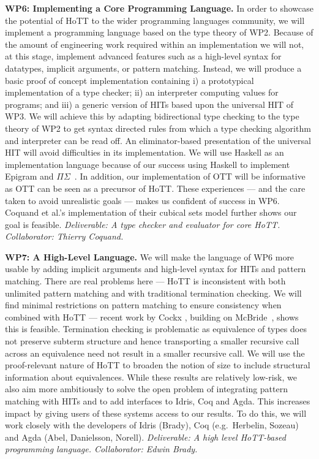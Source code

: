 \documentclass[a4paper,11pt]{article}
\newcommand{\eg}{{e.g.}\ }
\begin{document}
{\bf WP6: Implementing a Core Programming Language.} In order to
showcase the potential of HoTT to the wider programming languages
community, we will implement a programming language based on the type
theory of WP2.  Because of the amount of engineering work required
within an implementation we will not, at this stage, implement
advanced features such as a high-level syntax for datatypes, implicit
arguments, or pattern matching. Instead, we will produce a basic proof
of concept implementation containing i) a prototypical implementation
of a type checker; ii) an interpreter computing values for programs;
and iii) a generic version of HITs based upon the universal HIT of
WP3. We will achieve this by adapting bidirectional type checking to
the type theory of WP2 to get syntax directed rules from which a type
checking algorithm and interpreter can be read off. An
eliminator-based presentation of the universal HIT will
avoid difficulties in its implementation. We will use Haskell as an
implementation language because of our 
success using Haskell to implement Epigram and
$\Pi\Sigma$~\cite{alti:checking,easy,alti:pisigma-new}. In addition,
our implementation of OTT will be informative as OTT can be seen as a
precursor of HoTT.  These experiences --- and the care taken to avoid
unrealistic goals --- makes us confident of success in
WP6. Coquand et al.'s implementation of their cubical sets
model further shows our goal is feasible. {\em Deliverable: A type
  checker and evaluator for core HoTT.  Collaborator: Thierry Coquand.
}


{\bf WP7: A High-Level Language.} We will make the
language of WP6 more usable by adding implicit arguments and
high-level syntax for HITs and pattern matching. There are real
problems here --- HoTT is inconsistent with both unlimited pattern
matching and with traditional termination checking. We will find
minimal restrictions on pattern matching to ensure consistency when
combined with HoTT --- recent work by Cockx \cite{cockx-without-k},
building on McBride~\cite{viewftl}, shows this is
feasible. Termination checking is problematic as equivalence of types
does not preserve subterm structure and hence transporting a smaller
recursive call across an equivalence need not result in a smaller
recursive call. We will use the proof-relevant nature of HoTT to
broaden the notion of size to include structural information about
equivalences. While these results are relatively low-risk, we also aim
more ambitiously to solve the open problem of integrating pattern
matching with HITs and to add interfaces to Idris, Coq and Agda. This
increases impact by giving users of these systems access to our
results. To do this, we will work closely with the developers of Idris
(Brady), Coq (\eg Herbelin, Sozeau) and Agda (Abel, Danielsson, Norell). {\em
  Deliverable: A high level HoTT-based programming language.
  Collaborator: Edwin Brady.  }
\end{document}
